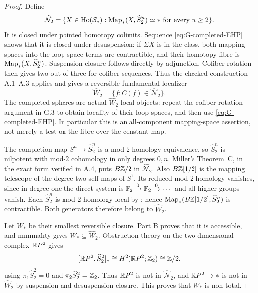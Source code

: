 \begin{proof}
Define
\[
 \widehat{\mathcal N}_2
 =\{X\in\operatorname{Ho}(\mathcal S_*):\operatorname{Map}_*(X,\widehat S^n_2)\simeq *
                       \text{ for every }n\geq2\}.
\]
It is closed under pointed homotopy colimits. Sequence \eqref{eq:G-completed-EHP} shows that it is closed under desuspension: if $\Sigma X$ is in the class, both mapping spaces into the loop-space terms are contractible, and their homotopy fibre is $\operatorname{Map}_*(X,\widehat S^n_2)$. Suspension closure follows directly by adjunction. Cofiber rotation then gives two out of three for cofiber sequences. Thus the checked construction A.1--A.3 applies and gives a reversible fundamental localizer
\[
 \widehat W_2=\{f:C(f)\in\widehat{\mathcal N}_2\}.
\]
The completed spheres are actual $\widehat W_2$-local objects: repeat the cofiber-rotation argument in G.3 to obtain locality of their loop spaces, and then use \eqref{eq:G-completed-EHP}. In particular this is an all-component mapping-space assertion, not merely a test on the fibre over the constant map.

The completion map $S^n\to\widehat S^n_2$ is a mod-$2$ homology equivalence, so $\widehat S^n_2$ is nilpotent with mod-$2$ cohomology in only degrees $0,n$. Miller's Theorem~C, in the exact form verified in A.4, puts $B\mathbb Z/2$ in $\widehat{\mathcal N}_2$. Also $B\mathbb Z[1/2]$ is the mapping telescope of the degree-two self maps of $S^1$. Its reduced mod-$2$ homology vanishes, since in degree one the direct system is $\mathbb F_2\xrightarrow{0}\mathbb F_2\xrightarrow{0}\cdots$ and all higher groups vanish. Each $\widehat S^n_2$ is mod-$2$ homology-local by \cite[Theorems 11.1.1--11.1.2]{FGHMayPonto2012}; hence $\operatorname{Map}_*(B\mathbb Z[1/2],\widehat S^n_2)$ is contractible. Both generators therefore belong to $\widehat W_2$.

Let $W_*$ be their smallest reversible closure. Part B proves that it is accessible, and minimality gives $W_*\subseteq\widehat W_2$. Obstruction theory on the two-dimensional complex $\mathbb{R}P^2$ gives
\[
 [\mathbb{R}P^2,\widehat S^2_2]_*\cong
 H^2(\mathbb{R}P^2;\mathbb Z_2)\cong\mathbb Z/2,
\]
using $\pi_1\widehat S^2_2=0$ and $\pi_2\widehat S^2_2=\mathbb Z_2$. Thus $\mathbb{R}P^2$ is not in $\widehat{\mathcal N}_2$, and $\mathbb{R}P^2\to *$ is not in $\widehat W_2$ by suspension and desuspension closure. This proves that $W_*$ is non-total.


\end{proof}
